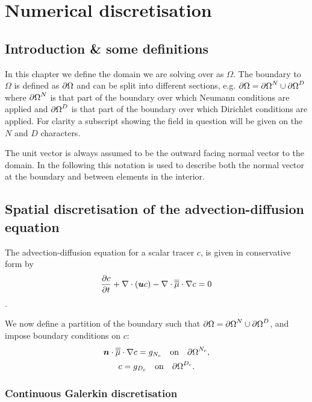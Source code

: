 \chapter{Numerical discretisation}\label{chap:numerical_discretisation}
\section{Introduction \& some definitions}\label{Sect:ND_Intro}

In this chapter we define the domain we are solving over as $\Omega$. The boundary to
$\Omega$ is defined as ${\partial\Omega}$
and can be split into different sections, e.g.
$\partial\Omega = {\partial\Omega}^{N}\cup {\partial\Omega}^{D}$
where ${\partial\Omega}^{N}$ is that part of the boundary over
which Neumann conditions are applied and ${\partial\Omega}^{D}$ is that part of the boundary over
which Dirichlet conditions are applied. For clarity a subscript showing the field in question will
be given on the $N$ and $D$ characters.

The unit vector  is always assumed to be the
outward facing normal vector to the domain.
In the following this notation is used to describe both the normal vector at the boundary
and between elements in the interior.

\section{Spatial discretisation of the advection-diffusion equation}
\label{Sect:ND_advection_diffusion_discretisation}

The advection-diffusion equation for a scalar tracer $c$,
is given in conservative form by
\begin{equation}\label{eq:advdif}
  \frac{\partial c}{\partial t} + \nabla\cdot\left({\mbox{\boldmath$u$}} c\right) - \nabla\cdot\overline{\overline{\mu}}\cdot\nabla c = 0
\end{equation}.

We now define a partition of the boundary such that
$\partial\Omega = {\partial\Omega}^{N}\cup {\partial\Omega}^{D}$, and impose boundary conditions on $c$:
\begin{gather}
  \label{eq:cboundary}
  {\mbox{\boldmath$n$}}\cdot\overline{\overline{\mu}}\cdot\nabla c=g_{N_c} \quad\textrm{on}\quad {\partial\Omega}^{N_c},\\
  c=g_{D_c} \quad\textrm{on}\quad {\partial\Omega}^{D_c}.
\end{gather}

\subsection{Continuous Galerkin discretisation}

